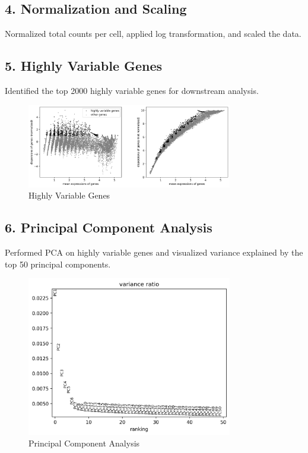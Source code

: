 \documentclass[12pt]{article}
\begin{document}
\subsection{4. Normalization and Scaling}
Normalized total counts per cell, applied log transformation, and scaled the data.

\subsection{5. Highly Variable Genes}
Identified the top 2000 highly variable genes for downstream analysis.

\begin{figure}[H]
    \centering
    \includegraphics[width=0.8\textwidth]{highly_variable_genes.png}
    \caption{Highly Variable Genes}
    \label{fig:highly_variable_genes}
\end{figure}

\subsection{6. Principal Component Analysis}
Performed PCA on highly variable genes and visualized variance explained by the top 50 principal components.

\begin{figure}[H]
    \centering
    \includegraphics[width=0.8\textwidth]{pca_variance.png}
    \caption{Principal Component Analysis}
    \label{fig:pca_variance}
\end{figure}
\end{document}
